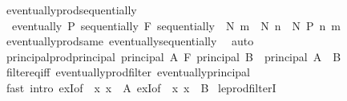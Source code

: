\begin{isabellebody}
\endisatagproof
{\isafoldproof}%
%
\isadelimproof
\isanewline
%
\endisadelimproof
\isanewline
{}\isamarkupfalse%
\ eventually{\isacharunderscore}{\kern0pt}prod{\isacharunderscore}{\kern0pt}sequentially{\isacharcolon}{\kern0pt}\isanewline
\ \ {\isachardoublequoteopen}eventually\ P\ {\isacharparenleft}{\kern0pt}sequentially\ {\isasymtimes}\isactrlsub F\ sequentially{\isacharparenright}{\kern0pt}\ {\isasymlongleftrightarrow}\ {\isacharparenleft}{\kern0pt}{\isasymexists}N{\isachardot}{\kern0pt}\ {\isasymforall}m\ {\isasymge}\ N{\isachardot}{\kern0pt}\ {\isasymforall}n\ {\isasymge}\ N{\isachardot}{\kern0pt}\ P\ {\isacharparenleft}{\kern0pt}n{\isacharcomma}{\kern0pt}\ m{\isacharparenright}{\kern0pt}{\isacharparenright}{\kern0pt}{\isachardoublequoteclose}\isanewline
%
\isadelimproof
\ \ %
\endisadelimproof
%
\isatagproof
{}\isamarkupfalse%
\ eventually{\isacharunderscore}{\kern0pt}prod{\isacharunderscore}{\kern0pt}same\ eventually{\isacharunderscore}{\kern0pt}sequentially\ \isamarkupfalse%
\ auto%
\endisatagproof
{\isafoldproof}%
%
\isadelimproof
\isanewline
%
\endisadelimproof
\isanewline
{}\isamarkupfalse%
\ principal{\isacharunderscore}{\kern0pt}prod{\isacharunderscore}{\kern0pt}principal{\isacharcolon}{\kern0pt}\ {\isachardoublequoteopen}principal\ A\ {\isasymtimes}\isactrlsub F\ principal\ B\ {\isacharequal}{\kern0pt}\ principal\ {\isacharparenleft}{\kern0pt}A\ {\isasymtimes}\ B{\isacharparenright}{\kern0pt}{\isachardoublequoteclose}\isanewline
%
\isadelimproof
\ \ %
\endisadelimproof
%
\isatagproof
{}\isamarkupfalse%
\ filter{\isacharunderscore}{\kern0pt}eq{\isacharunderscore}{\kern0pt}iff\ eventually{\isacharunderscore}{\kern0pt}prod{\isacharunderscore}{\kern0pt}filter\ eventually{\isacharunderscore}{\kern0pt}principal\isanewline
\ \ \isamarkupfalse%
\ {\isacharparenleft}{\kern0pt}fast\ intro{\isacharcolon}{\kern0pt}\ exI{\isacharbrackleft}{\kern0pt}of\ {\isacharunderscore}{\kern0pt}\ {\isachardoublequoteopen}{\isasymlambda}x{\isachardot}{\kern0pt}\ x\ {\isasymin}\ A{\isachardoublequoteclose}{\isacharbrackright}{\kern0pt}\ exI{\isacharbrackleft}{\kern0pt}of\ {\isacharunderscore}{\kern0pt}\ {\isachardoublequoteopen}{\isasymlambda}x{\isachardot}{\kern0pt}\ x\ {\isasymin}\ B{\isachardoublequoteclose}{\isacharbrackright}{\kern0pt}{\isacharparenright}{\kern0pt}%
\endisatagproof
{\isafoldproof}%
%
\isadelimproof
\isanewline
%
\endisadelimproof
\isanewline
{}\isamarkupfalse%
\ le{\isacharunderscore}{\kern0pt}prod{\isacharunderscore}{\kern0pt}filterI{\isacharcolon}{\kern0pt}\isanewline

\end{isabellebody}
